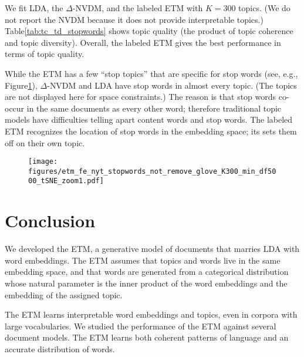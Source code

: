 \documentclass[11pt,a4paper]{article}
\begin{document}
We fit \gls{LDA}, the $\Delta$-\gls{NVDM}, and the labeled \gls{ETM}
with $K=300$ topics. (We do not report the \gls{NVDM} because it does
not provide interpretable topics.)  Table\nobreakspace \ref {tab:tc_td_stopwords} shows
topic quality (the product of topic coherence and topic
diversity). Overall, the labeled \gls{ETM} gives the best performance
in terms of topic quality.

While the \gls{ETM} has a few ``stop topics'' that are specific for
stop words (see, e.g., Figure\nobreakspace \ref {fig:topic_embedding_stops}),
$\Delta$-\gls{NVDM} and \gls{LDA} have stop words in almost every
topic.  (The topics are not displayed here for space constraints.) The
reason is that stop words co-occur in the same documents as every
other word; therefore traditional topic models have difficulties
telling apart content words and stop words. The labeled \gls{ETM}
recognizes the location of stop words in the embedding space;
its sets them off on their own topic.

\begin{figure}[t]
 \centering
 \texttt{[image: figures/etm\_fe\_nyt\_stopwords\_not\_remove\_glove\_K300\_min\_df5000\_tSNE\_zoom1.pdf]}
 \label{fig:topic_embedding_stops}
\end{figure}




 \section{Conclusion}
\label{sec:conclusion}

We developed the \gls{ETM}, a generative model of documents that
marries \gls{LDA} with word embeddings. The \gls{ETM} assumes that
topics and words live in the same embedding space, and that words are
generated from a categorical distribution whose natural parameter is
the inner product of the word embeddings and the embedding of the
assigned topic.

The \gls{ETM} learns interpretable word embeddings and topics, even in
corpora with large vocabularies. We studied the performance of the
\gls{ETM} against several document models. The \gls{ETM} learns both
coherent patterns of language and an accurate distribution of words.
\end{document}
